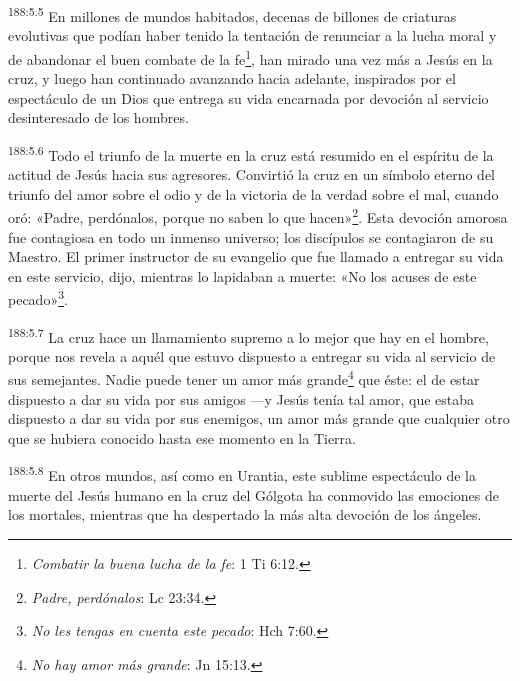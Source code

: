 \par
\textsuperscript{188:5.5} En millones de mundos habitados, decenas de billones de criaturas evolutivas que podían haber tenido la tentación de renunciar a la lucha moral y de abandonar el buen combate de la fe\footnote{\textit{Combatir la buena lucha de la fe}: 1 Ti 6:12.}, han mirado una vez más a Jesús en la cruz, y luego han continuado avanzando hacia adelante, inspirados por el espectáculo de un Dios que entrega su vida encarnada por devoción al servicio desinteresado de los hombres.

\par
\textsuperscript{188:5.6} Todo el triunfo de la muerte en la cruz está resumido en el espíritu de la actitud de Jesús hacia sus agresores. Convirtió la cruz en un símbolo eterno del triunfo del amor sobre el odio y de la victoria de la verdad sobre el mal, cuando oró: «Padre, perdónalos, porque no saben lo que hacen»\footnote{\textit{Padre, perdónalos}: Lc 23:34.}. Esta devoción amorosa fue contagiosa en todo un inmenso universo; los discípulos se contagiaron de su Maestro. El primer instructor de su evangelio que fue llamado a entregar su vida en este servicio, dijo, mientras lo lapidaban a muerte: «No los acuses de este pecado»\footnote{\textit{No les tengas en cuenta este pecado}: Hch 7:60.}.

\par
\textsuperscript{188:5.7} La cruz hace un llamamiento supremo a lo mejor que hay en el hombre, porque nos revela a aquél que estuvo dispuesto a entregar su vida al servicio de sus semejantes. Nadie puede tener un amor más grande\footnote{\textit{No hay amor más grande}: Jn 15:13.} que éste: el de estar dispuesto a dar su vida por sus amigos ---y Jesús tenía tal amor, que estaba dispuesto a dar su vida por sus enemigos, un amor más grande que cualquier otro que se hubiera conocido hasta ese momento en la Tierra.

\par
\textsuperscript{188:5.8} En otros mundos, así como en Urantia, este sublime espectáculo de la muerte del Jesús humano en la cruz del Gólgota ha conmovido las emociones de los mortales, mientras que ha despertado la más alta devoción de los ángeles.

